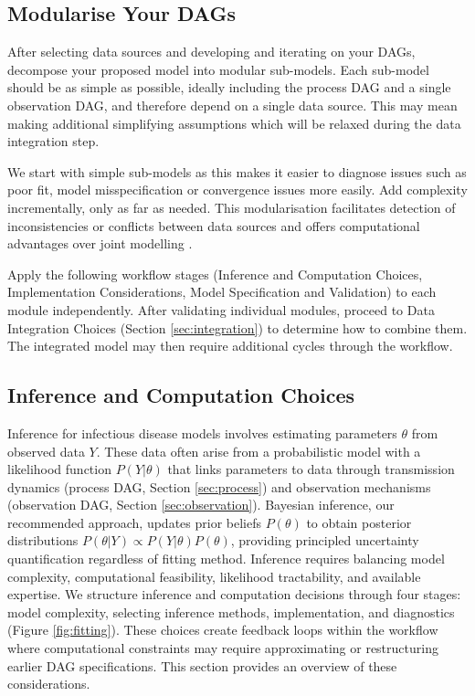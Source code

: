 \documentclass{article}
\begin{document}
\subsection{Modularise Your DAGs} \label{sec:modularise}

After selecting data sources and developing and iterating on your DAGs, decompose your proposed model into modular sub-models.
Each sub-model should be as simple as possible, ideally including the process DAG and a single observation DAG, and therefore depend on a single data source.
This may mean making additional simplifying assumptions which will be relaxed during the data integration step.

We start with simple sub-models as this makes it easier to diagnose issues such as poor fit, model misspecification or convergence issues more easily.
Add complexity incrementally, only as far as needed.
This modularisation facilitates detection of inconsistencies or conflicts between data sources \citep{presanis2013conflict,manderson2023combining} and offers computational advantages over joint modelling \citep{deangelis2018analysing,goudie2019joining,gelman2020bayesian,nicholson2022interoperability}.

Apply the following workflow stages (Inference and Computation Choices, Implementation Considerations, Model Specification and Validation) to each module independently.
After validating individual modules, proceed to Data Integration Choices (Section \ref{sec:integration}) to determine how to combine them.
The integrated model may then require additional cycles through the workflow.

\subsection{Inference and Computation Choices}\label{sec:fitting}

Inference for infectious disease models involves estimating parameters $\theta$ from observed data $Y$.
 These data often arise from a probabilistic model with a likelihood function $P(Y |
  \theta)$ that links parameters to data through transmission dynamics (process DAG, Section \ref{sec:process}) and observation mechanisms (observation DAG, Section \ref{sec:observation}).
Bayesian inference, our recommended approach, updates prior beliefs $P(\theta)$ to obtain posterior distributions $P(\theta | Y) \propto P(Y|\theta) P(\theta)$, providing principled uncertainty quantification regardless of fitting method.
Inference requires balancing model complexity, computational feasibility, likelihood tractability, and available expertise.
We structure inference and computation decisions through four stages: model complexity, selecting inference methods, implementation, and diagnostics (Figure \ref{fig:fitting}). 
These choices create feedback loops within the workflow where computational constraints may require approximating or restructuring earlier DAG specifications.
This section provides an overview of these considerations.
\end{document}

